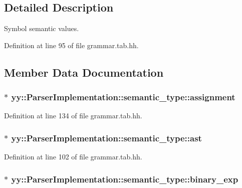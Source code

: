 \subsection{Detailed Description}
Symbol semantic values. 

Definition at line 95 of file grammar.tab.hh.



\subsection{Member Data Documentation}
\hypertarget{unionyy_1_1_parser_implementation_1_1semantic__type_ad3aedd5c8266010fea64404de4a8837e}{
\subsubsection[{assignment}]{$\ast$ {\bf yy::ParserImplementation::semantic\_\-type::assignment}}}
\label{unionyy_1_1_parser_implementation_1_1semantic__type_ad3aedd5c8266010fea64404de4a8837e}


Definition at line 134 of file grammar.tab.hh.

\hypertarget{unionyy_1_1_parser_implementation_1_1semantic__type_a74902b5ed1e5effbeccbe38ab0b188da}{
\subsubsection[{ast}]{$\ast$ {\bf yy::ParserImplementation::semantic\_\-type::ast}}}
\label{unionyy_1_1_parser_implementation_1_1semantic__type_a74902b5ed1e5effbeccbe38ab0b188da}


Definition at line 102 of file grammar.tab.hh.

\hypertarget{unionyy_1_1_parser_implementation_1_1semantic__type_aff5196c62908ef43bac13f7440ba30e8}{
\subsubsection[{binary\_\-exp}]{$\ast$ {\bf yy::ParserImplementation::semantic\_\-type::binary\_\-exp}}}
\label{unionyy_1_1_parser_implementation_1_1semantic__type_aff5196c62908ef43bac13f7440ba30e8}


